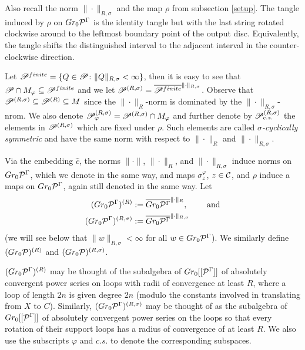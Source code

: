 Also recall the norm $\|\cdot\|_{R,\sigma}$ and the map $\rho$ from subsection \ref{setup}. The tangle induced by $\rho$ on $Gr_0\mc{P}^\Gamma$ is the identity tangle but with the last string rotated clockwise around to the leftmost boundary point of the output disc. Equivalently, the tangle shifts the distinguished interval to the adjacent interval in the counter-clockwise direction.

Let $\P^{finite}=\{Q\in \P\colon \|Q\|_{R,\sigma}<\infty\}$, then it is easy to see that $\P\cap M_\varphi\subset \P^{finite}$ and we let $\P^{(R,\sigma)}=\overline{\P^{finite}}^{\|\cdot\|_{R,\sigma}}$. Observe that $\P^{(R,\sigma)}\subset \P^{(R)}\subset M$ since the $\|\cdot\|_R$-norm is dominated by the $\|\cdot\|_{R,\sigma}$-nrom. We also denote $\P^{(R,\sigma)}_\varphi=\P^{(R,\sigma)}\cap M_\varphi$ and further denote by $\P^{(R,\sigma)}_{c.s.}$ the elements in $\P^{(R,\sigma)}$ which are fixed under $\rho$. Such elements are called \emph{$\sigma$-cyclically symmetric} and have the same norm with respect to $\|\cdot\|_R$ and $\|\cdot\|_{R,\sigma}$.



Via the embedding $\hat{c}$, the norms $\|\cdot\|$, $\|\cdot\|_R$, and $\|\cdot\|_{R,\sigma}$ induce norms on $Gr_0 \mc{P}^\Gamma$, which we denote in the same way, and maps $\sigma_z^\varphi$, $z\in\C$, and $\rho$ induce a maps on $Gr_0 \mc{P}^\Gamma$, again still denoted in the same way. Let
\begin{align*}
(Gr_0 \mc{P}^\Gamma)^{(R)}&:=\overline{Gr_0 \mc{P}^\Gamma}^{\|\cdot\|_R},\qquad \text{ and}\\
(Gr_0 \mc{P}^\Gamma)^{(R,\sigma)} &:= \overline{Gr_0 \mc{P}^\Gamma}^{\|\cdot\|_{R,\sigma}}
\end{align*}
(we will see below that $\|w\|_{R,\sigma}<\infty$ for all $w\in Gr_0 \mc{P}^\Gamma$). We similarly define $(Gr_0\mc{P})^{(R)}$ and $(Gr_0\mc{P})^{(R,\sigma)}$.

$(Gr_0 \mc{P}^\Gamma)^{(R)}$ may be thought of the subalgebra of $Gr_0[[\mc{P}^\Gamma]]$ of absolutely convergent power series on loops with radii of convergence at least $R$, where a loop of length $2n$ is given degree $2n$ (modulo the constants involved in translating from $X$ to $C$). Similarly, $(Gr_0 \mc{P}^\Gamma)^{(R,\sigma)}$ may be thought of as the subalgebra of $Gr_0[[\mc{P}^\Gamma]]$ of absolutely convergent power series on the loops so that every rotation of their support loops has a radius of convergence of at least $R$. We also use the subscripts $\varphi$ and $c.s.$ to denote the corresponding subspaces.

